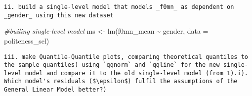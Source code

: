 \documentclass[
]{article}
\newenvironment{Shaded}{\begin{snugshade}}{\end{snugshade}}
\newcommand{\AttributeTok}[1]{\textcolor[rgb]{0.77,0.63,0.00}{#1}}
\newcommand{\CommentTok}[1]{\textcolor[rgb]{0.56,0.35,0.01}{\textit{#1}}}
\newcommand{\FunctionTok}[1]{\textcolor[rgb]{0.00,0.00,0.00}{#1}}
\newcommand{\NormalTok}[1]{#1}
\newcommand{\OtherTok}[1]{\textcolor[rgb]{0.56,0.35,0.01}{#1}}
\newcommand{\SpecialCharTok}[1]{\textcolor[rgb]{0.00,0.00,0.00}{#1}}
\newcommand{\StringTok}[1]{\textcolor[rgb]{0.31,0.60,0.02}{#1}}
\begin{document}
\begin{Shaded}
\end{Shaded}

\begin{verbatim}
ii. build a single-level model that models _f0mn_ as dependent on _gender_ using this new dataset
\end{verbatim}

\begin{Shaded}
\begin{Highlighting}[]
\CommentTok{\#builing single{-}level model }
\NormalTok{ms }\OtherTok{\textless{}{-}} \FunctionTok{lm}\NormalTok{(f0mn\_mean }\SpecialCharTok{\textasciitilde{}}\NormalTok{ gender, }\AttributeTok{data =}\NormalTok{ politeness\_sel)}
\end{Highlighting}
\end{Shaded}

\begin{verbatim}
iii. make Quantile-Quantile plots, comparing theoretical quantiles to the sample quantiles) using `qqnorm` and `qqline` for the new single-level model and compare it to the old single-level model (from 1).i). Which model's residuals ($\epsilon$) fulfil the assumptions of the General Linear Model better?)
\end{verbatim}
\end{document}
